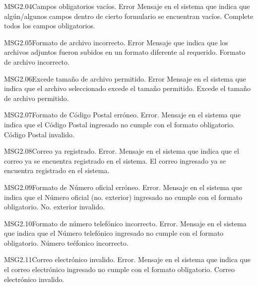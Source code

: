 \begin{Message}{MSG2.04}{Campos obligatorios vacíos.}
	\MSGitem[Tipo:] Error
	\MSGitem[Objetivo:] Mensaje en el sistema que indica que algún/algunos campos dentro de cierto formulario se encuentran vacíos.
	\MSGitem[Redacción:] Complete todos los campos obligatorios.
\end{Message}

\begin{Message}{MSG2.05}{Formato de archivo incorrecto.}
	\MSGitem[Tipo:] Error
	\MSGitem[Objetivo:] Mensaje que indica que los archivos adjuntos fueron subidos en un formato diferente al requerido.
	\MSGitem[Redacción:] Formato de archivo incorrecto.
\end{Message}

\begin{Message}{MSG2.06}{Excede tamaño de archivo permitido.}
	\MSGitem[Tipo:] Error
	\MSGitem[Objetivo:] Mensaje en el sistema que indica que el archivo seleccionado excede el tamaño permitido.
	\MSGitem[Redacción:] Excede el tamaño de archivo permitido.
\end{Message}

\begin{Message}{MSG2.07}{Formato de Código Postal erróneo.}
	\MSGitem[Tipo:] Error.	
	\MSGitem[Objetivo:] Mensaje en el sistema que indica que el Código Postal ingresado no cumple con el formato obligatorio.
	\MSGitem[Redacción:] Código Postal invalido.
\end{Message}

\begin{Message}{MSG2.08}{Correo ya registrado.}
	\MSGitem[Tipo:] Error.	
	\MSGitem[Objetivo:] Mensaje en el sistema que indica que el correo ya se encuentra registrado en el sistema.
	\MSGitem[Redacción:] El correo ingresado ya se encuentra registrado en el sistema.
\end{Message}
\begin{Message}{MSG2.09}{Formato de Número oficial  erróneo.}
	\MSGitem[Tipo:] Error.	
	\MSGitem[Objetivo:] Mensaje en el sistema que indica que el Número oficial (no. exterior) ingresado no cumple con el formato obligatorio.
	\MSGitem[Redacción:] No. exterior invalido.
\end{Message}
\begin{Message}{MSG2.10}{Formato de número telefónico incorrecto.}
	\MSGitem[Tipo:] Error.	
	\MSGitem[Objetivo:] Mensaje en el sistema que indica que el Número telefónico ingresado no cumple con el formato obligatorio.
	\MSGitem[Redacción:] Número teéfonico incorrecto.
\end{Message}
\begin{Message}{MSG2.11}{Correo electrónico invalido.}
	\MSGitem[Tipo:] Error.	
	\MSGitem[Objetivo:] Mensaje en el sistema que indica que el correo electrónico ingresado no cumple con el formato obligatorio.
	\MSGitem[Redacción:] Correo electrónico invalido.
\end{Message}

